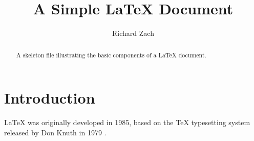 \documentclass{article}
\title{A Simple \LaTeX{} Document}
\author{Richard Zach}
\begin{document}
\maketitle

\begin{abstract}
A skeleton file illustrating the basic components of a \LaTeX{}
 document.
\end{abstract}

\section{Introduction}

\LaTeX{} was originally developed in 1985, based on the \TeX{}
 typesetting system released by Don Knuth in 1979
 \cite{Knuth1986,Lamport1986}.

\printbibliography
\end{document}
